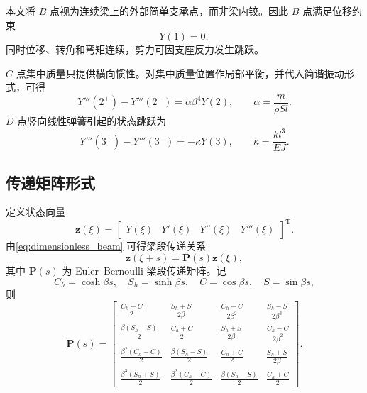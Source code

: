 \documentclass[UTF8,a4paper,zihao=-4]{ctexart}
\begin{document}
本文将 $B$ 点视为连续梁上的外部简单支承点，而非梁内铰。因此 $B$ 点满足位移约束
\begin{equation}
Y(1)=0 ,
\end{equation}
同时位移、转角和弯矩连续，剪力可因支座反力发生跳跃。

$C$ 点集中质量只提供横向惯性。对集中质量位置作局部平衡，并代入简谐振动形式，可得
\begin{equation}
Y'''(2^+)-Y'''(2^-)=\alpha\beta^4Y(2),
\qquad
\alpha=\frac{m}{\rho Sl}.
\label{eq:mass_jump}
\end{equation}
$D$ 点竖向线性弹簧引起的状态跳跃为
\begin{equation}
Y'''(3^+)-Y'''(3^-)=-\kappa Y(3),
\qquad
\kappa=\frac{kl^3}{EJ}.
\label{eq:spring_jump}
\end{equation}

\subsection{传递矩阵形式}

定义状态向量
\begin{equation}
\bm z(\xi)=
\begin{bmatrix}
Y(\xi)&Y'(\xi)&Y''(\xi)&Y'''(\xi)
\end{bmatrix}^{\mathrm T}.
\end{equation}
由\cref{eq:dimensionless_beam} 可得梁段传递关系
\begin{equation}
\bm z(\xi+s)=\bm P(s)\bm z(\xi),
\end{equation}
其中 $\bm P(s)$ 为 Euler--Bernoulli 梁段传递矩阵。记
\begin{equation}
C_h=\cosh \beta s,\quad S_h=\sinh \beta s,\quad C=\cos \beta s,\quad S=\sin \beta s,
\end{equation}
则
\begin{equation}
\bm P(s)=
\begin{bmatrix}
\frac{C_h+C}{2} & \frac{S_h+S}{2\beta} & \frac{C_h-C}{2\beta^2} & \frac{S_h-S}{2\beta^3}\\
\frac{\beta(S_h-S)}{2} & \frac{C_h+C}{2} & \frac{S_h+S}{2\beta} & \frac{C_h-C}{2\beta^2}\\
\frac{\beta^2(C_h-C)}{2} & \frac{\beta(S_h-S)}{2} & \frac{C_h+C}{2} & \frac{S_h+S}{2\beta}\\
\frac{\beta^3(S_h+S)}{2} & \frac{\beta^2(C_h-C)}{2} & \frac{\beta(S_h-S)}{2} & \frac{C_h+C}{2}
\end{bmatrix}.
\label{eq:P}
\end{equation}
\end{document}
